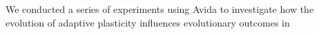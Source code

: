 We conducted a series of experiments using Avida to investigate how the evolution of adaptive plasticity influences evolutionary outcomes in  






